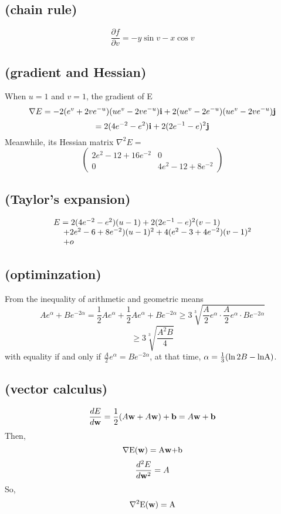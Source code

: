 \documentclass[a4paper]{exam}
\begin{document}
\subsection{(chain rule)}
\[\frac{{\partial f}}{{\partial v}} =  - y\sin v - x\cos v\]
\subsection{(gradient and Hessian)}
When $u=1$ and $v=1$, the gradient of E
\[\nabla E = -2({e^v} + 2v{e^{ - u}})(u{e^v} - 2v{e^{ - u}}){\bf{i}} + 2(u{e^v} - 2{e^{ - u}})(u{e^v} - 2v{e^{ - u}}){\bf{j}}\]
\[ = 2(4{e^{ - 2}} - {e^2}){\bf{i}} + 2{(2{e^{ - 1}} - e)^2}{\bf{j}}\]
\indent Meanwhile, its Hessian matrix ${\nabla ^2}E = $
\[\left( {\begin{array}{*{20}{c}}
	{2{e^2} - 12 + 16{e^{ - 2}}}&0\\
	0&{4{e^2} - 12 + 8{e^{ - 2}}}
	\end{array}} \right)\]
\subsection{(Taylor's expansion)}
\[\begin{array}{l}
E = 2(4{e^{ - 2}} - {e^2})(u - 1) + 2{(2{e^{ - 1}} - e)^2}(v - 1)\\
{\kern 1pt} {\kern 1pt} {\kern 1pt} {\kern 1pt} {\kern 1pt} {\kern 1pt} {\kern 1pt} {\kern 1pt} {\kern 1pt} {\kern 1pt} {\kern 1pt} {\kern 1pt} {\rm{ + }}2{e^2} - 6 + 8{e^{ - 2}}){(u - 1)^2} + 4({e^2} - 3 + 4{e^{ - 2}}){(v - 1)^2}\\
{\kern 1pt} {\kern 1pt} {\kern 1pt} {\kern 1pt} {\kern 1pt} {\kern 1pt} {\kern 1pt} {\kern 1pt} {\kern 1pt} {\kern 1pt} {\kern 1pt} {\kern 1pt} {\rm{ + }}o
\end{array}\]
\subsection{(optiminzation)}
From the inequality of arithmetic and geometric means
\[A{e^\alpha } + B{e^{ - 2\alpha }} = \frac{1}{2}A{e^\alpha } + \frac{1}{2}A{e^\alpha } + B{e^{ - 2\alpha }} \ge 3\sqrt[3]{{\frac{A}{2}{e^\alpha } \cdot \frac{A}{2}{e^\alpha } \cdot B{e^{ - 2\alpha }}}}\]
\[ \ge 3\sqrt[3]{{\frac{{{A^2}B}}{4}}}\]
\indent with equality if and only if  $\frac{A}{2}{e^\alpha } = B{e^{ - 2\alpha }}$, at that time, $\alpha  = \frac{1}{3}(\ln 2B - {\mathop{\rm lnA}\nolimits} )$.
\subsection{(vector calculus)}
\[\frac{{dE}}{{d{\bf{w}}}} = \frac{1}{2}(A{\bf{w}} + A{\bf{w}}) + {\bf{b}} = A{\bf{w}} + {\bf{b}}\]
Then,
\[\nabla {\rm{E(}}{\bf{w}}{\rm{)  =  A}}{\bf{w}}{\rm{  +  b}}\]
\[\frac{{{d^2}E}}{{d{{\bf{w}}^2}}} = A\]
So,
\[{\nabla ^2}{\rm{E(}}{\bf{w}}{\rm{)  =  A}}\]
\end{document}
